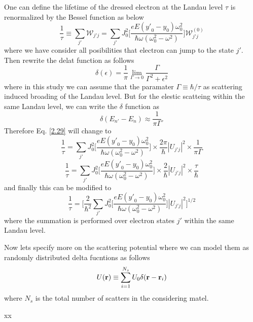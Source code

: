 \noindent
One can define the lifetime of the dressed electron at the Landau level $\tau$ is renormalized by the Bessel function as below
\begin{equation} \label{2.29}
    \frac{1}{\tau} \equiv \sum_{j'} \mathcal{W}_{j'j} =
    \sum_{j'}
    J_0^2\bigg[\frac{eE({y'}_0 - y_0)\omega_0^2}{\hbar\omega(\omega_0^2-\omega^2)}\bigg]
    \mathcal{W}_{j'j}^{(0)}
\end{equation}
where we have consider all posibilities that electron can jump to the state $j'$. Then rewrite the delat function as follows
\begin{equation} \label{2.30}
    \delta(\epsilon) =
    \frac{1}{\pi} \lim_{\Gamma \rightarrow 0 } \frac{\Gamma}{\Gamma^2 + \epsilon^2}
\end{equation}
where in this study we can assume that the paramater $\Gamma \equiv \hbar/\tau$ as scattering induced broading of the Landau level. But for the elestic scatteing within the same Landau level, we can write the $\delta$ function as
\begin{equation} \label{2.31}
    \delta(E_{n'} - E_{n}) \approx
    \frac{1}{\pi \Gamma}.
\end{equation}
Therefore Eq. \eqref{2.29} will change to
\begin{equation} \label{2.32}
    \frac{1}{\tau} =
    \sum_{j'}
    J_0^2\bigg[\frac{eE({y'}_0 - y_0)\omega_0^2}{\hbar\omega(\omega_0^2-\omega^2)}\bigg]
    \times
    \frac{2\pi}{\hbar} |U_{j'j}|^2 \times \frac{1}{\pi \Gamma}
\end{equation}
\begin{equation} \label{2.33}
    \frac{1}{\tau} =
    \sum_{j'}
    J_0^2\bigg[\frac{eE({y'}_0 - y_0)\omega_0^2}{\hbar\omega(\omega_0^2-\omega^2)}\bigg]
    \times
    \frac{2}{\hbar} |U_{j'j}|^2 \times \frac{\tau}{\hbar}
\end{equation}
and finally this can be modified to
\begin{equation} \label{2.34}
    \frac{1}{\tau} =
    \bigg[
    \frac{2}{\hbar^2}
    \sum_{j'}
    J_0^2\bigg[\frac{eE({y'}_0 - y_0)\omega_0^2}{\hbar\omega(\omega_0^2-\omega^2)}\bigg]
    |U_{j'j}|^2
    \bigg]^{1/2}
\end{equation}
where the summation is performed over electron states $j'$ within the same Landau level.

\noindent
Now lets specify more on the scattering potential where we can model them as randomly distributed delta fucntions as follows
\begin{equation} \label{2.35}
    U(\vb{r}) \equiv \sum_{i=1}^{N_s} U_0 \delta(\vb{r} - \vb{r}_i)
\end{equation}
where $N_s$ is the total number of scatters in the considering matel.

















xx
